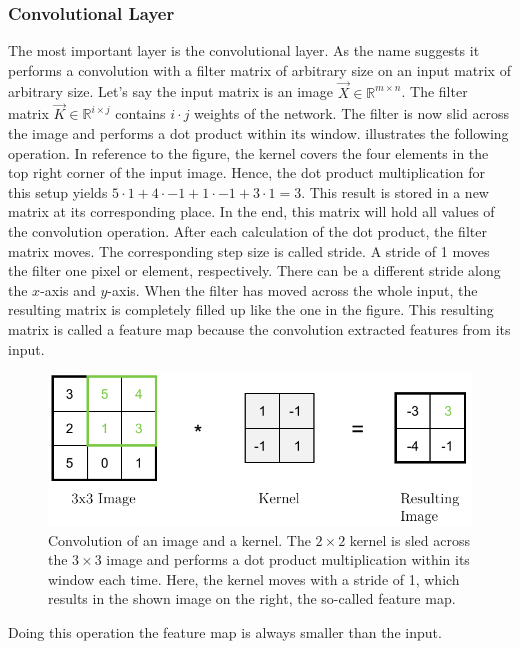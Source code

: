 \subsubsection{Convolutional Layer}
\label{sec:cnn-convolutional-layer}
The most important layer is the convolutional layer.
As the name suggests it performs a convolution with a filter matrix of arbitrary size on an input matrix of arbitrary size.
Let's say the input matrix is an image $\vec{X} \in \mathbb{R}^{m \times n}$.
The filter matrix $\vec{K} \in \mathbb{R}^{i \times j}$ contains $i \cdot j$ weights of the network.
The filter is now slid across the image and performs a dot product within its window.
 illustrates the following operation.
In reference to the figure, the kernel covers the four elements in the top right corner of the input image.
Hence, the dot product multiplication for this setup yields $5 \cdot 1+4 \cdot -1+1 \cdot -1+3 \cdot 1=3$.
This result is stored in a new matrix at its corresponding place.
In the end, this matrix will hold all values of the convolution operation.
After each calculation of the dot product, the filter matrix moves.
The corresponding step size is called stride.
A stride of 1 moves the filter one pixel or element, respectively.
There can be a different stride along the $x$-axis and $y$-axis.
When the filter has moved across the whole input, the resulting matrix is completely filled up like the one in the figure.
This resulting matrix is called a feature map because the convolution extracted features from its input.
\begin{figure}
	\centering
	\includegraphics{images/convolution.pdf}
	\caption[Convolution of an Image with a Kernel]{Convolution of an image and a kernel. The $2 \times 2$ kernel is sled across the $3 \times 3$ image and performs a dot product multiplication within its window each time. Here, the kernel moves with a stride of 1, which results in the shown image on the right, the so-called feature map.}
	\label{fig:convolution}
\end{figure}
Doing this operation the feature map is always smaller than the input.
